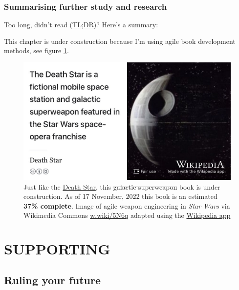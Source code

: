 \documentclass[
]{book}
\begin{document}
\hypertarget{tldr12}{%
\section{Summarising further study and research}\label{tldr12}}

Too long, didn't read (\href{https://en.wiktionary.org/wiki/too_long;_didn\%27t_read}{TL;DR})? Here's a summary:

This chapter is under construction because I'm using agile book development methods, see figure \ref{fig:deathstar9-fig}.

\begin{figure}

{\centering \includegraphics[width=0.99\linewidth]{images/DeathStar2} 

}

\caption{Just like the \href{https://en.wikipedia.org/wiki/Death_Star}{Death Star}, this \sout{galactic superweapon} book is under construction. As of 17 November, 2022 this book is an estimated \textbf{37\% complete}. Image of agile weapon engineering in \emph{Star Wars} via Wikimedia Commons \href{https://w.wiki/5N6q}{w.wiki/5N6q} adapted using the \href{https://apps.apple.com/gb/app/wikipedia/id324715238}{Wikipedia app}}\label{fig:deathstar9-fig}
\end{figure}

\hypertarget{part-supporting}{%
\part{SUPPORTING}\label{part-supporting}}

\hypertarget{ruling}{%
\chapter{Ruling your future}\label{ruling}}
\end{document}
